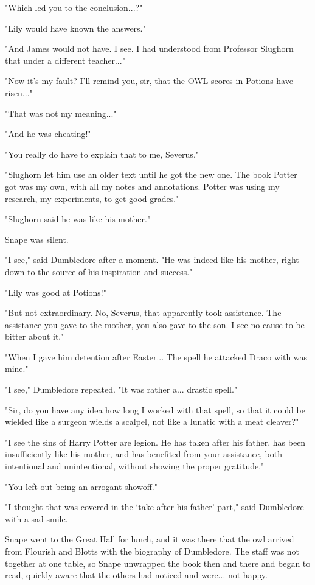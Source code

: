 "Which led you to the conclusion...?"

"Lily would have known the answers."

"And James would not have. I see. I had understood from Professor Slughorn that under a different teacher..."

"Now it's my fault? I'll remind you, sir, that the OWL scores in Potions have risen..."

"That was not my meaning..."

"And he was cheating!"

"You really do have to explain that to me, Severus."

"Slughorn let him use an older text until he got the new one. The book Potter got was my own, with all my notes and annotations. Potter was using my research, my experiments, to get good grades."

"Slughorn said he was like his mother."

Snape was silent.

"I see," said Dumbledore after a moment. "He was indeed like his mother, right down to the source of his inspiration and success."

"Lily was good at Potions!"

"But not extraordinary. No, Severus, that apparently took assistance. The assistance you gave to the mother, you also gave to the son. I see no cause to be bitter about it."

"When I gave him detention after Easter... The spell he attacked Draco with was mine."

"I see," Dumbledore repeated. "It was rather a... drastic spell."

"Sir, do you have any idea how long I worked with that spell, so that it could be wielded like a surgeon wields a scalpel, not like a lunatic with a meat cleaver?"

"I see the sins of Harry Potter are legion. He has taken after his father, has been insufficiently like his mother, and has benefited from your assistance, both intentional and unintentional, without showing the proper gratitude."

"You left out being an arrogant showoff."

"I thought that was covered in the `take after his father' part," said Dumbledore with a sad smile.

Snape went to the Great Hall for lunch, and it was there that the owl arrived from Flourish and Blotts with the biography of Dumbledore. The staff was not together at one table, so Snape unwrapped the book then and there and began to read, quickly aware that the others had noticed and were... not happy.

